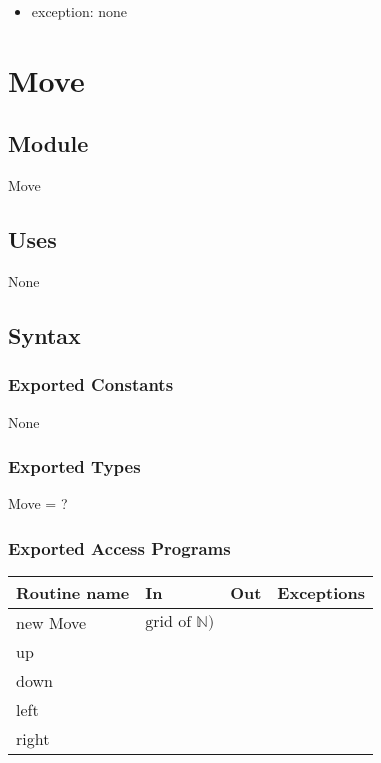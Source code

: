 \documentclass[12pt]{article}
\begin{document}
\begin{itemize}
\begin{itemize}
\item exception: none
\end{itemize}

\newpage

\section* {Move}

\subsection*{Module}

Move

\subsection* {Uses}

None

\subsection* {Syntax}

\subsubsection* {Exported Constants}

None

\subsubsection* {Exported Types}

Move = ?

\subsubsection* {Exported Access Programs}

\begin{tabular}{| l | l | l | p{5cm} |}
  \hline
  \textbf{Routine name} & \textbf{In} & \textbf{Out} & \textbf{Exceptions}\\
  \hline
  new Move & $\text{grid of } \mathbb{N})$ & & \\
  \hline
  up & & & \\
  \hline
  down & & & \\
  \hline
  left & & & \\
  \hline
  right & & & \\
  \hline
  

\end{tabular}
\end{itemize}
\end{document}

